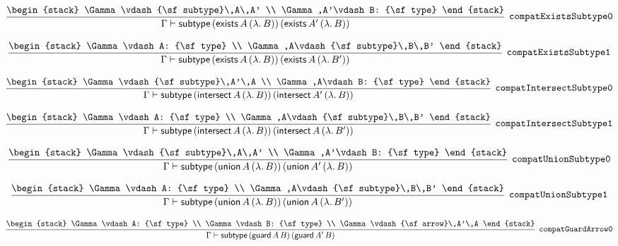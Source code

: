 \[
\infer[{\tt compatExistsSubtype0}]{\Gamma \vdash {\sf subtype}\,({\sf exists}\,A\,(\lambda .\,B))\,({\sf exists}\,A'\,(\lambda .\,B))}{
\begin{stack}
\Gamma \vdash {\sf subtype}\,A\,A'
\\
\Gamma ,A'\vdash B: {\sf type}
\end{stack}}
\]

\[
\infer[{\tt compatExistsSubtype1}]{\Gamma \vdash {\sf subtype}\,({\sf exists}\,A\,(\lambda .\,B))\,({\sf exists}\,A\,(\lambda .\,B'))}{
\begin{stack}
\Gamma \vdash A: {\sf type}
\\
\Gamma ,A\vdash {\sf subtype}\,B\,B'
\end{stack}}
\]

\[
\infer[{\tt compatIntersectSubtype0}]{\Gamma \vdash {\sf subtype}\,({\sf intersect}\,A\,(\lambda .\,B))\,({\sf intersect}\,A'\,(\lambda .\,B))}{
\begin{stack}
\Gamma \vdash {\sf subtype}\,A'\,A
\\
\Gamma ,A\vdash B: {\sf type}
\end{stack}}
\]

\[
\infer[{\tt compatIntersectSubtype1}]{\Gamma \vdash {\sf subtype}\,({\sf intersect}\,A\,(\lambda .\,B))\,({\sf intersect}\,A\,(\lambda .\,B'))}{
\begin{stack}
\Gamma \vdash A: {\sf type}
\\
\Gamma ,A\vdash {\sf subtype}\,B\,B'
\end{stack}}
\]

\[
\infer[{\tt compatUnionSubtype0}]{\Gamma \vdash {\sf subtype}\,({\sf union}\,A\,(\lambda .\,B))\,({\sf union}\,A'\,(\lambda .\,B))}{
\begin{stack}
\Gamma \vdash {\sf subtype}\,A\,A'
\\
\Gamma ,A'\vdash B: {\sf type}
\end{stack}}
\]

\[
\infer[{\tt compatUnionSubtype1}]{\Gamma \vdash {\sf subtype}\,({\sf union}\,A\,(\lambda .\,B))\,({\sf union}\,A\,(\lambda .\,B'))}{
\begin{stack}
\Gamma \vdash A: {\sf type}
\\
\Gamma ,A\vdash {\sf subtype}\,B\,B'
\end{stack}}
\]

\[
\infer[{\tt compatGuardArrow0}]{\Gamma \vdash {\sf subtype}\,({\sf guard}\,A\,B)\,({\sf guard}\,A'\,B)}{
\begin{stack}
\Gamma \vdash A: {\sf type}
\\
\Gamma \vdash B: {\sf type}
\\
\Gamma \vdash {\sf arrow}\,A'\,A
\end{stack}}
\]

